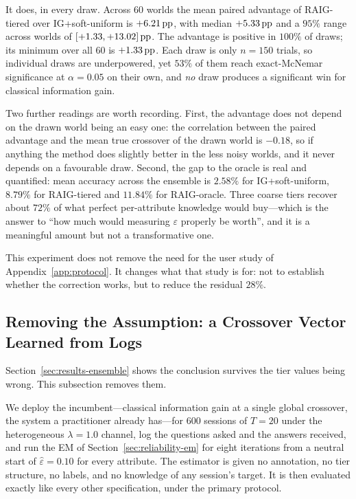 It does, in every draw. Across $60$ worlds the mean paired advantage of
RAIG-tiered over IG+soft-uniform is $+6.21\,\text{pp}$, with median $+5.33\,\text{pp}$ and a
$95\%$ range across worlds of $[+1.33, +13.02]\,\text{pp}$. The advantage is positive
in $100\%$ of draws; its minimum over all $60$ is $+1.33\,\text{pp}$. Each draw is only
$n=150$ trials, so individual draws are underpowered, yet $53\%$ of them reach
exact-McNemar significance at $\alpha = 0.05$ on their own, and \emph{no} draw
produces a significant win for classical information gain.

Two further readings are worth recording. First, the advantage does not depend
on the drawn world being an easy one: the correlation between the paired
advantage and the mean true crossover of the drawn world is $-0.18$, so if
anything the method does slightly better in the less noisy worlds, and it never
depends on a favourable draw. Second, the gap to the oracle is real and
quantified: mean accuracy across the ensemble is $2.58\%$ for IG+soft-uniform,
$8.79\%$ for RAIG-tiered and $11.84\%$ for RAIG-oracle. Three coarse tiers
recover about $72\%$ of what perfect per-attribute knowledge would buy---which
is the answer to ``how much would measuring $\varepsilon$ properly be worth'',
and it is a meaningful amount but not a transformative one.

This experiment does not remove the need for the user study of
Appendix~\ref{app:protocol}. It changes what that study is for: not to
establish whether the correction works, but to reduce the residual $28\%$.

\subsection{Removing the Assumption: a Crossover Vector Learned from Logs}
\label{sec:results-em}

Section~\ref{sec:results-ensemble} shows the conclusion survives the tier values
being wrong. This subsection removes them.

We deploy the incumbent---classical information gain at a single global
crossover, the system a practitioner already has---for $600$ sessions of $T=20$
under the heterogeneous $\lambda=1.0$ channel, log the questions asked and the
answers received, and run the EM of Section~\ref{sec:reliability-em} for eight
iterations from a neutral start of $\hat\varepsilon = 0.10$ for every attribute.
The estimator is given no annotation, no tier structure, no labels, and no
knowledge of any session's target. It is then evaluated exactly like every other
specification, under the primary protocol.

